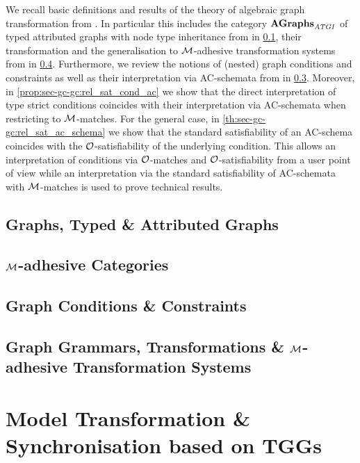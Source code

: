 \documentclass{eceasst}
\begin{document}
We recall basic definitions and results of the theory of algebraic graph transformation from \cite{Ehrig:2006:FAG:1121741,FAGT2}.
In particular this includes the category $\mathbf{AGraphs}_\mathit{ATGI}$ of typed attributed graphs with node type inheritance from \cite{DBLP:journals/tcs/GolasLEO12,FAGT2} in \cref{sec-gt-graphs}, their transformation and the generalisation to ${\cal M}$-adhesive transformation systems from \cite{FAGT2} in \cref{sec-gt-trafo}.
Furthermore, we review the notions of (nested) graph conditions and constraints as well as their interpretation via AC-schemata from \cite{DBLP:journals/mscs/HabelP09,FAGT2} in \cref{sec-gt-gc}.
Moreover, in \cref{prop:sec-gc-gc:rel_sat_cond_ac} we show that the direct interpretation of type strict conditions coincides with their interpretation via AC-schemata when restricting to ${\cal M}$-matches.
For the general case, in \cref{th:sec-gc-gc:rel_sat_ac_schema} we show that the standard satisfiability of an AC-schema coincides with the ${\cal O}$-satisfiability of the underlying condition.
This allows an interpretation of conditions via ${\cal O}$-matches and ${\cal O}$-satisfiability from a user point of view while an interpretation via the standard satisfiability of AC-schemata with ${\cal M}$-matches is used to prove technical results.

\subsection{Graphs, Typed \& Attributed Graphs}
\label{sec-gt-graphs}


\subsection{${\cal M}$-adhesive Categories}
\label{sec-gt-M-adh}

% 
\subsection{Graph Conditions \& Constraints}
\label{sec-gt-gc}


\subsection{Graph Grammars, Transformations \& ${\cal M}$-adhesive Transformation Systems}
\label{sec-gt-trafo}


\section{Model Transformation \& Synchronisation based on TGGs}
\label{sec-gen-intro-mt-ms-tgg}
\end{document}
